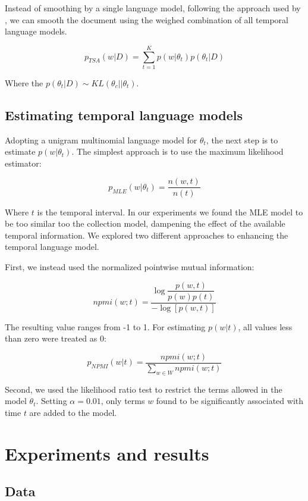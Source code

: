 \documentclass{sig-alternate}
\begin{document}
Instead of smoothing by a single language model, following the approach used by \cite{Wei2006}, we can smooth the document using the weighed combination of all temporal language models.

\[
p_{TSA}(w \vert D)= \sum_{t=1}^{K} p(w \vert \theta_t) p(\theta_t \vert D)
\]

Where the $p(\theta_t \vert D) \sim KL(\theta_c \vert\vert \theta_t)$.


\subsection{Estimating temporal language models}

Adopting a unigram multinomial language model for $\theta_t$, the next step is to estimate $p(w \vert \theta_t)$.  
The simplest approach is to use the maximum likelihood estimator:

\[
p_{MLE} (w \vert \theta_t) = \dfrac{n(w, t)}{n(t)}
\]

Where $t$ is the temporal interval. In our experiments we found the MLE model to be too similar too 
the collection model, dampening the effect of the available temporal information. We explored two
different approaches to enhancing the temporal language model.  

First, we instead used the normalized pointwise mutual information:

\[
npmi(w;t) = \dfrac{\log \dfrac{p(w,t)}{p(w)p(t)}}{-\log[p(w,t)]}
\]

The resulting value ranges from -1 to 1. For estimating $p(w \vert t)$, all values less than zero were treated as 0:

\[
p_{NPMI} (w \vert t) = \dfrac{npmi(w;t)}{\sum_{w \in W} npmi(w; t)}
\]

Second, we used the likelihood ratio test to restrict the terms allowed in the model $\theta_t$. Setting $\alpha=0.01$, 
only terms $w$ found to be significantly associated with time $t$ are added to the model.

\section{Experiments and results}
\subsection{Data}
\end{document}

